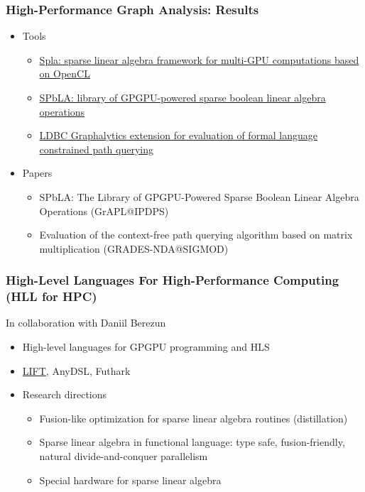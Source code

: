 \documentclass[xcolor=table,aspectratio=169]{beamer}
\begin{document}
\begin{frame}[fragile]
  \frametitle{High-Performance Graph Analysis: Results}
    \begin{itemize}
      \item Tools
      \begin{itemize}
        \item \href{https://github.com/JetBrains-Research/spla}{Spla: sparse linear algebra framework for multi-GPU computations based on OpenCL}
        \item \href{https://github.com/JetBrains-Research/spbla}{SPbLA: library of GPGPU-powered sparse boolean linear algebra operations}    
        \item \href{https://github.com/JetBrains-Research/ldbc_graphalytics}{LDBC Graphalytics extension for evaluation of formal language constrained path querying}    
      \end{itemize}
      \item Papers 
      \begin{itemize}
        \item SPbLA: The Library of GPGPU-Powered Sparse Boolean Linear Algebra Operations (GrAPL@IPDPS)
        \item Evaluation of the context-free path querying algorithm based on matrix multiplication (GRADES-NDA@SIGMOD)
      \end{itemize} 
    \end{itemize}
\end{frame}

\begin{frame}[fragile]
  \frametitle{High-Level Languages For High-Performance Computing (HLL for HPC)}
  In collaboration with Daniil Berezun
  \begin{itemize}    
  \item High-level languages for GPGPU programming and HLS
  \item \href{https://www.lift-project.org/}{LIFT}, AnyDSL, Futhark
  \pause
  \item Research directions
  \begin{itemize}
    \item Fusion-like optimization for sparse linear algebra routines (distillation)
    \item Sparse linear algebra in functional language: type safe, fusion-friendly, natural divide-and-conquer parallelism
    \item Special hardware for sparse linear algebra
  \end{itemize}
  \end{itemize}
\end{frame}
\end{document}
